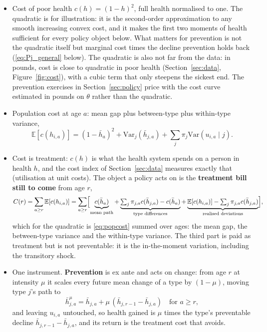 \documentclass[11pt]{article}
\newcommand{\E}{\mathbb{E}}
\newcommand{\Var}{\mathrm{Var}}
\begin{document}
	
	\begin{itemize}
		\item Cost of poor health $c(h)=(1-h)^2$, full health normalised to one. The quadratic is for illustration: it is the second-order approximation to any smooth increasing convex cost, and it makes the first two moments of health sufficient for every policy object below. What matters for prevention is not the quadratic itself but marginal cost times the decline prevention holds back (\eqref{eq:Pj_general} below). The quadratic is also not far from the data: in pounds, cost is close to quadratic in poor health (Section~\ref{sec:data}, Figure~\ref{fig:cost}), with a cubic term that only steepens the sickest end. The prevention exercises in Section~\ref{sec:policy} price with the cost curve estimated in pounds on $\theta$ rather than the quadratic.
		\item Population cost at age $a$: mean gap plus between-type plus within-type variance,
		\begin{equation}
			\E[c(h_{i,a})]=(1-\bar h_a)^2+\Var_j(\bar h_{j,a})+\textstyle\sum_j\pi_j\Var(u_{i,a}\mid j).
			\label{eq:popcost}
		\end{equation}
		\item Cost is treatment: $c(h)$ is what the health system spends on a person in health $h$, and the cost index of Section~\ref{sec:data} measures exactly that (utilisation at unit costs). The object a policy acts on is the \textbf{treatment bill still to come} from age $r$,
		\begin{equation}
			C(r)=\sum_{a\ge r}\E[c(h_{i,a})]=\sum_{a\ge r}\Bigl[\underbrace{c(\bar h_a)}_{\text{mean path}}+\underbrace{\textstyle\sum_j\pi_{j,a}c(\bar h_{j,a})-c(\bar h_a)}_{\text{type differences}}+\underbrace{\E[c(h_{i,a})]-\textstyle\sum_j\pi_{j,a}c(\bar h_{j,a})}_{\text{realised deviations}}\Bigr],
			\label{eq:C}
		\end{equation}
		which for the quadratic is \eqref{eq:popcost} summed over ages: the mean gap, the between-type variance and the within-type variance. The third part is paid as treatment but is not preventable: it is the in-the-moment variation, including the transitory shock.
		\item One instrument. \textbf{Prevention} is ex ante and acts on change: from age $r$ at intensity $\mu$ it scales every future mean change of a type by $(1-\mu)$, moving type $j$'s path to
		$$
		\bar h^{\mu}_{j,a}=\bar h_{j,a}+\mu\,(\bar h_{j,r-1}-\bar h_{j,a})\quad\text{for } a\ge r,
		$$
		and leaving $u_{i,a}$ untouched, so health gained is $\mu$ times the type's preventable decline $\bar h_{j,r-1}-\bar h_{j,a}$, and its return is the treatment cost that avoids.
	\end{itemize}
	
\end{document}
